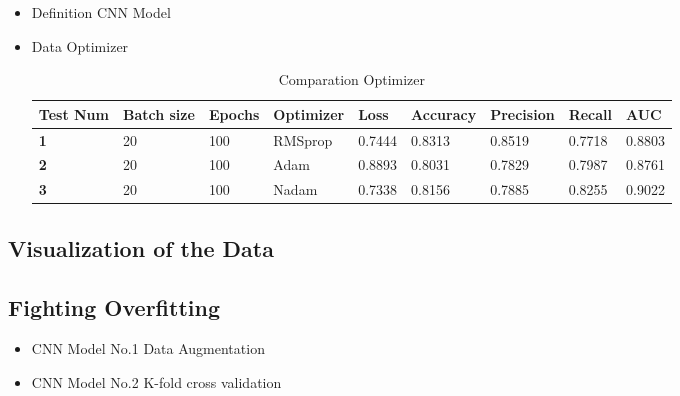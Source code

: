 \documentclass{book}
\begin{document}
            \begin{itemize}
                \item Definition CNN Model
                \item Data Optimizer
                
                \begin{table}
                    \begin{center}
                        \begin{tabular}{m{1.8cm}m{1.8cm}m{1cm}m{1.5cm}m{1cm}m{1.3cm}m{1.3cm}m{1cm}m{1cm}}
                            \midrule
                            \textbf{Test Num} & \textbf{Batch size} &	\textbf{Epochs}	& \textbf{Optimizer} &	\textbf{Loss}	& \textbf{Accuracy} &	\textbf{Precision}	& \textbf{Recall}	& \textbf{AUC} \\
                            \midrule
                            \textbf{1} & 20 &	100	& RMSprop & 0.7444	& 0.8313	& 0.8519	& 0.7718	& 0.8803 \\
                            \midrule
                            \textbf{2} & 20 &	100	& Adam & 0.8893	& 0.8031	& 0.7829	& 0.7987	& 0.8761 \\
                            \midrule
                            \textbf{3} & 20 &	100	& Nadam & 0.7338	& 0.8156	& 0.7885	& 0.8255	& 0.9022 \\
                            \midrule
                        \end{tabular}
                    \end{center}
                    \caption{\label{tab:optimizer}Comparation Optimizer}
                \end{table}

                

            \end{itemize}

            \subsection{Visualization of the Data}
            \subsection{Fighting Overfitting}

            \begin{itemize}
                \item CNN Model No.1 Data Augmentation
                \item CNN Model No.2 K-fold cross validation
            \end{itemize}
\end{document}
